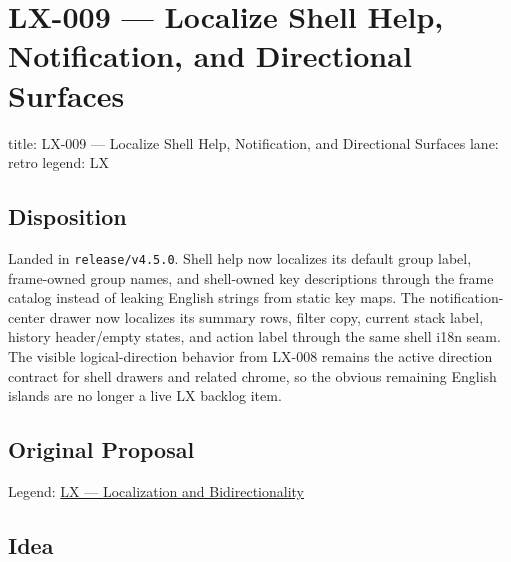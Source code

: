 \chapter{LX-009 --- Localize Shell Help, Notification, and Directional Surfaces}\label{record-361}

\smallskip

\begin{RecordMeta}
title: LX-009 — Localize Shell Help, Notification, and Directional Surfaces
lane: retro
legend: LX

\end{RecordMeta}

\section{Disposition}\label{record-361-disposition}

Landed in \texttt{r\allowbreak{}e\allowbreak{}l\allowbreak{}e\allowbreak{}a\allowbreak{}s\allowbreak{}e\allowbreak{}/\allowbreak{}v\allowbreak{}4\allowbreak{}.\allowbreak{}5\allowbreak{}.\allowbreak{}0}. Shell help now localizes its default group label, frame-owned group names, and shell-owned key descriptions through the frame catalog instead of leaking English strings from static key maps. The notification-center drawer now localizes its summary rows, filter copy, current stack label, history header/empty states, and action label through the same shell i18n seam. The visible logical-direction behavior from LX-008 remains the active direction contract for shell drawers and related chrome, so the obvious remaining English islands are no longer a live LX backlog item.

\section{Original Proposal}\label{record-361-original-proposal}

Legend: \href{https://github.com/flyingrobots/bijou/blob/1853ad902f6bf219326409e7f743a5a1d6517dbc/docs/method/legends/LX-localization-and-bidirectionality.md}{LX --- Localization and Bidirectionality}

\section{Idea}\label{record-361-idea}

